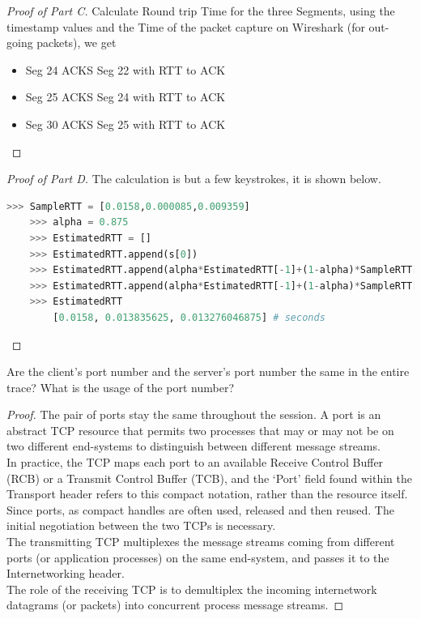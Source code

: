 \documentclass[../main.tex]{subfiles}
\begin{document}
\begin{proof}[Proof of Part C]
    Calculate Round trip Time for the three Segments, using the timestamp values  and the Time of the packet capture on Wireshark (for out-going packets), we get
	\begin{itemize}
	    \item Seg 24 ACKS Seg 22 with RTT to ACK	
        \item Seg 25 ACKS Seg 24 with RTT to ACK 	
        \item Seg 30 ACKS Seg 25 with RTT to ACK 	
	\end{itemize}
\end{proof}
\begin{proof}[Proof of Part D]
    The calculation is but a few keystrokes, it is shown below.
    \begin{lstlisting}[language=python]
    >>> SampleRTT = [0.0158,0.000085,0.009359]
    >>> alpha = 0.875
    >>> EstimatedRTT = []
    >>> EstimatedRTT.append(s[0])
    >>> EstimatedRTT.append(alpha*EstimatedRTT[-1]+(1-alpha)*SampleRTT[1])
    >>> EstimatedRTT.append(alpha*EstimatedRTT[-1]+(1-alpha)*SampleRTT[2])
    >>> EstimatedRTT
        [0.0158, 0.013835625, 0.013276046875] # seconds\end{lstlisting}
\end{proof}
\newpage

\begin{wts}
	Are the client’s port number and the server’s port number the same in the entire trace? What is the usage of the port number?
\end{wts}
\begin{proof}
    The pair of ports stay the same throughout the session. A port is an abstract TCP resource that permits two processes that may or may not be on two different end-systems to distinguish between different message streams. \\
    
    In practice, the TCP maps each port to an available Receive Control Buffer (RCB) or a Transmit Control Buffer (TCB), and the ‘Port’ field found within the Transport header refers to this compact notation, rather than the resource itself.\\
    
    Since ports, as compact handles are often used, released and then reused. The initial negotiation between the two TCPs is necessary.\\
    
    The transmitting TCP multiplexes the message streams coming from different ports (or application processes) on the same end-system, and passes it to the Internetworking header. \\
    
    The role of the receiving TCP is to demultiplex the incoming internetwork datagrams (or packets) into concurrent process message streams.
\end{proof}
\newpage
\end{document}
